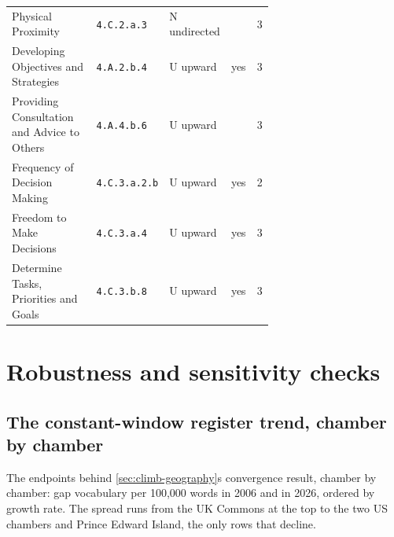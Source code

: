 \begin{longtable}[]{@{}p{0.36\linewidth}p{0.15\linewidth}p{0.15\linewidth}cr@{}}
Physical Proximity & \texttt{4.C.2.a.3} & N undirected & & 3 \\
Developing Objectives and Strategies & \texttt{4.A.2.b.4} & U upward & yes & 3 \\
Providing Consultation and Advice to Others & \texttt{4.A.4.b.6} & U upward & & 3 \\
Frequency of Decision Making & \texttt{4.C.3.a.2.b} & U upward & yes & 2 \\
Freedom to Make Decisions & \texttt{4.C.3.a.4} & U upward & yes & 3 \\
Determine Tasks, Priorities and Goals & \texttt{4.C.3.b.8} & U upward & yes & 3 \\
\end{longtable}
\endgroup

\section{Robustness and sensitivity checks}\label{app:robustness}

\subsection{The constant-window register trend, chamber by chamber}\label{sec:climb-table}

The endpoints behind \cref{sec:climb-geography}\textquotesingle s convergence result, chamber by chamber: gap
vocabulary per 100,000 words in 2006 and in 2026, ordered by growth rate. The
spread runs from the UK Commons at the top to the two US chambers and Prince
Edward Island, the only rows that decline.

